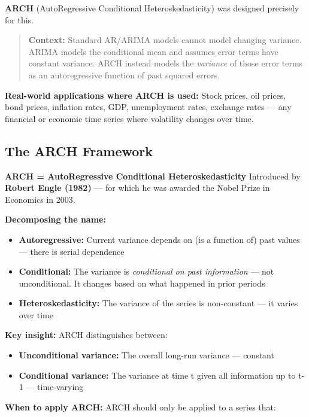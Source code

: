 \documentclass[12pt,openany]{book}
\theoremstyle{definition}
\theoremstyle{remark}
\begin{document}
\textbf{ARCH} (AutoRegressive Conditional Heteroskedasticity) was designed precisely for this.

\begin{quote}
\textbf{Context:} Standard AR/ARIMA models cannot model changing variance. ARIMA models the conditional mean and assumes error terms have constant variance. ARCH instead models the \emph{variance} of those error terms as an autoregressive function of past squared errors.

\end{quote}
\textbf{Real-world applications where ARCH is used:} Stock prices, oil prices, bond prices, inflation rates, GDP, unemployment rates, exchange rates --- any financial or economic time series where volatility changes over time.

\medskip
\subsection{The ARCH Framework}
\textbf{ARCH = AutoRegressive Conditional Heteroskedasticity} Introduced by \textbf{Robert Engle (1982)} --- for which he was awarded the Nobel Prize in Economics in 2003.

\textbf{Decomposing the name:}

\begin{itemize}
\item \textbf{Autoregressive:} Current variance depends on (is a function of) past values --- there is serial dependence


\item \textbf{Conditional:} The variance is \emph{conditional on past information} --- not unconditional. It changes based on what happened in prior periods


\item \textbf{Heteroskedasticity:} The variance of the series is non-constant --- it varies over time


\end{itemize}
\textbf{Key insight:} ARCH distinguishes between:

\begin{itemize}
\item \textbf{Unconditional variance:} The overall long-run variance --- constant


\item \textbf{Conditional variance:} The variance at time t given all information up to t-1 --- time-varying


\end{itemize}
\textbf{When to apply ARCH:} ARCH should only be applied to a series that:
\end{document}
